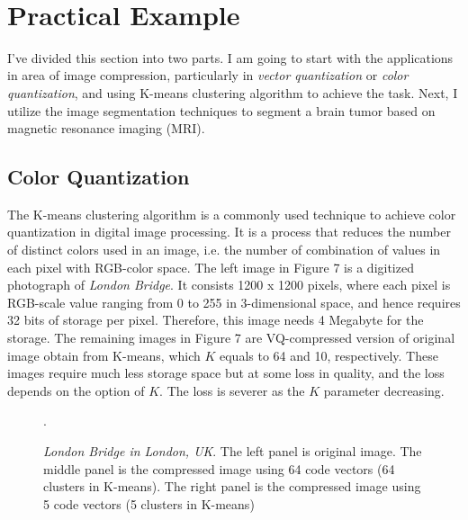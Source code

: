 \documentclass[a4paper]{article}
\begin{document}
\


\section{Practical Example}

I've divided this section into two parts. I am going to start with the applications in area of image compression, particularly in \textit{vector quantization} or \textit{color quantization}, and using K-means clustering algorithm to achieve the task. Next, I utilize the image segmentation techniques to segment a brain tumor based on magnetic resonance imaging (MRI).

\subsection{Color Quantization}

The K-means clustering algorithm is a commonly used technique to achieve color quantization in digital image processing. It is a process that reduces the number of distinct colors used in an image, i.e. the number of combination of values in each pixel with RGB-color space. The left image in Figure 7 is a digitized photograph of \textit{London Bridge}. It consists 1200 x 1200 pixels, where each pixel is RGB-scale value ranging from 0 to 255 in 3-dimensional space, and hence requires 32 bits of storage per pixel. Therefore, this image needs 4 Megabyte for the storage. The remaining images in Figure 7 are VQ-compressed version of original image obtain from K-means, which $K$ equals to 64 and 10, respectively. These images require much less storage space but at some loss in quality, and the loss depends on the option of $K$. The loss is severer as the $K$ parameter decreasing.


\begin{figure}[h!]%
    \centering
    \caption{\textit{London Bridge in London, UK}. The left panel is original image. The middle panel is the compressed image using 64 code vectors (64 clusters in K-means). The right panel is the compressed image using 5 code vectors (5 clusters in K-means)}.
\end{figure}
\end{document}
